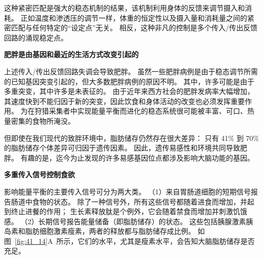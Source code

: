 这种紧密匹配是强大的稳态机制的结果，该机制利用身体的反馈来调节摄入和消耗。
正如温度和渗透压的调节一样，体重的恒定性以及摄入量和消耗量之间的紧密匹配与任何特定的“设定点”无关。
相反，这种非凡的控制是多个传入/传出反馈回路的涌现稳定点。


\textbf{肥胖是由基因和最近的生活方式改变引起的}

上述传入/传出反馈回路失调会导致肥胖。
虽然一些肥胖病例是由于稳态调节所需的已知基因突变引起的，但大多数肥胖病例的原因不明。
其中，许多可能是由于多重突变，其中许多是未表征的。
由于近年来西方社会的肥胖发病率大幅增加，其速度快到不能归因于新的突变，因此饮食和身体活动的改变也必须发挥重要作用。
为在狩猎采集者中实现能量平衡而进化的稳态系统很可能被丰富、可口、热量密集的食物所淹没。


但即使在我们现代的致胖环境中，脂肪储存仍然存在很大差异：
只有 41\% 到 70\% 的脂肪储存个体差异可归因于遗传因素。
因此，遗传易感性和环境共同导致肥胖。
有趣的是，迄今为止发现的许多易感基因位点都涉及影响大脑功能的基因。


\textbf{多重传入信号控制食欲}

影响能量平衡的主要传入信号可分为两大类。
（1）来自胃肠道细胞的短期信号报告肠道中食物的状态。
除了一种信号外，所有这些信号都随着进食而增加，并起到终止进餐的作用；
生长素释放肽是个例外，它会随着禁食而增加并刺激饥饿感。
（2）长期信号报告能量储备（即脂肪储存）的状态。 
这些包括胰腺激素胰岛素和脂肪细胞激素瘦素，两者的释放都与脂肪储存成比例。
如图~\ref{fig:41_14}A~所示，它们的水平，尤其是瘦素水平，会告知大脑脂肪储存是否充足。


